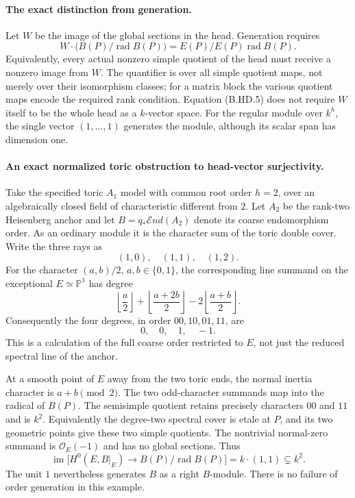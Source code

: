 \paragraph{The exact distinction from generation.}
Let $W$ be the image of the global sections in the head.  Generation
requires
\[
           W\cdot\bigl(B(P)/\operatorname{rad}B(P)\bigr)
                         =E(P)/E(P)\operatorname{rad}B(P). \tag{B.HD.5}
\]
Equivalently, every actual nonzero simple quotient of the head must
receive a nonzero image from $W$.  The quantifier is over all simple
quotient maps, not merely over their isomorphism classes; for a matrix
block the various quotient maps encode the required rank condition.
Equation (B.HD.5) does not require $W$ itself to be the whole head as
a $k$-vector space.  For the regular module over $k^h$, the single
vector $(1,\ldots,1)$ generates the module, although its scalar span
has dimension one.

\paragraph{An exact normalized toric obstruction to head-vector surjectivity.}
Take the specified toric $A_1$ model with common root order $h=2$,
over an algebraically closed field of characteristic different from
$2$.  Let $A_2$ be the rank-two Heisenberg anchor and let
$B=q_*\mathcal End(A_2)$ denote its coarse endomorphism order.
As an ordinary module it is the character sum of the toric double
cover.  Write the three rays as
\[
                         (1,0),\quad(1,1),\quad(1,2).
\]
For the character $(a,b)/2$, $a,b\in\{0,1\}$, the corresponding line
summand on the exceptional $E\simeq\mathbb P^1$ has degree
\[
 \left\lfloor\frac a2\right\rfloor
 +\left\lfloor\frac{a+2b}{2}\right\rfloor
 -2\left\lfloor\frac{a+b}{2}\right\rfloor.
\]
Consequently the four degrees, in order $00,10,01,11$, are
\[
                             0,\quad0,\quad1,\quad-1. \tag{B.HD.6}
\]
This is a calculation of the full coarse order restricted to $E$,
not just the reduced spectral line of the anchor.

At a smooth point of $E$ away from the two toric ends, the normal
inertia character is $a+b\pmod2$.  The two odd-character summands
map into the radical of $B(P)$.  The semisimple quotient retains
precisely characters $00$ and $11$ and is $k^2$.  Equivalently the
degree-two spectral cover is etale at $P$, and its two geometric
points give these two simple quotients.  The nontrivial normal-zero
summand is $\mathcal O_E(-1)$ and has no global sections.  Thus
\[
       \operatorname{im}\bigl[H^0(E,B|_E)\to
                       B(P)/\operatorname{rad}B(P)\bigr]
                         =k\cdot(1,1)\subsetneq k^2.   \tag{B.HD.7}
\]
The unit $1$ nevertheless generates $B$ as a right $B$-module.
There is no failure of order generation in this example.

